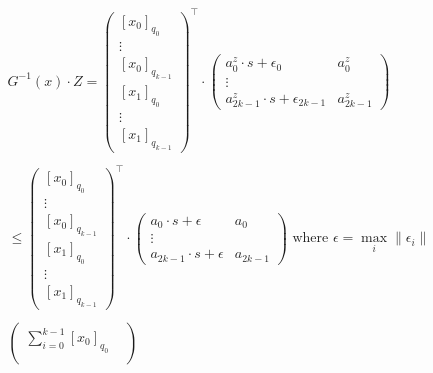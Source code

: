    \begin{gather*}
        G^{-1}(x)\cdot Z = 
        \begin{pmatrix}
            [x_0]_{q_0} \\ 
            \vdots \\ 
            [x_0]_{q_{k-1}} \\
            [x_1]_{q_0} \\ 
            \vdots \\
            [x_1]_{q_{k-1}}
        \end{pmatrix}^\intercal
        \cdot
        \begin{pmatrix}
            a_0^z\cdot s + \epsilon_0 & a_0^z \\
            \vdots \\
            a_{2k-1}^z\cdot s + \epsilon_{2k-1} & a_{2k-1}^z
        \end{pmatrix}
    \\
    \\
        \leq 
        \begin{pmatrix}
            [x_0]_{q_0} \\ 
            \vdots \\ 
            [x_0]_{q_{k-1}} \\
            [x_1]_{q_0} \\ 
            \vdots \\
            [x_1]_{q_{k-1}}
        \end{pmatrix}^\intercal
        \cdot
        \begin{pmatrix}
            a_0\cdot s + \epsilon & a_0 \\
            \vdots \\
            a_{2k-1}\cdot s + \epsilon & a_{2k-1}
        \end{pmatrix}
        \text{ where } \epsilon = \max_i\|\epsilon_i\|
    \\
    \\
        \left(
        \begin{array}{cc}
             \sum\limits_{i=0}^{k-1} [x_0]_{q_0} &  \\
             & 
        \end{array}
        \right)
    \end{gather*}
    
